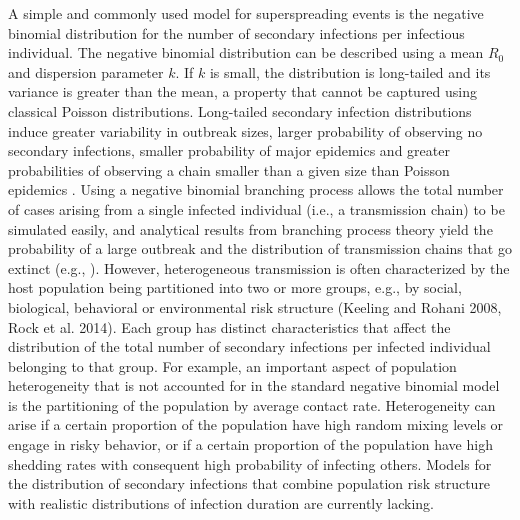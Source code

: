 \documentclass{imammb}
\numberwithin{equation}{section}
\begin{document}


 
A simple and commonly used model for superspreading events is the negative binomial distribution for the number of secondary infections per infectious individual. The negative binomial distribution can be described using a mean $R_0$ and dispersion parameter $k$. If $k$ is small, the distribution is long-tailed and its variance is greater than the mean, a property that cannot be captured using classical Poisson distributions. Long-tailed secondary infection distributions induce greater variability in outbreak sizes, larger probability of observing no secondary infections, smaller probability of major epidemics and greater probabilities of observing a chain smaller than a given size than Poisson epidemics \citep{Althouse2020-dn}. Using a negative binomial branching process allows 
the total number of cases arising from a single infected individual (i.e., a transmission chain) to be simulated easily, and analytical results from branching process theory yield the probability of a large outbreak \citep{Mode2000-hp} and the distribution of transmission chains that go extinct (e.g., \citep{Blumberg2013-xv}).  However, heterogeneous transmission is often characterized by the host population being partitioned into two or more groups, e.g., by social, biological, behavioral or environmental risk structure (Keeling and Rohani 2008, Rock et al. 2014).   Each group has distinct characteristics that affect the distribution of the total number of secondary infections per infected individual belonging to that group. For example, an important aspect of population heterogeneity that is not accounted for in the standard negative binomial model is the partitioning of the population by average contact rate. Heterogeneity can arise if a certain proportion of the population have high random mixing levels or engage in risky behavior, or if a certain proportion of the population have high shedding rates with consequent high probability of infecting others. Models for the distribution of secondary infections that combine population risk structure with realistic distributions of infection duration are currently lacking.
 
\end{document}
